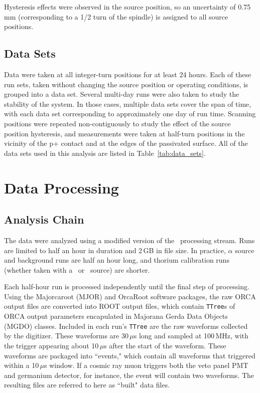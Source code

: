 \documentclass[groupedaddress,rmp,amsmath,amssymb,bibnotes,altaffilletter,twocolumn]{revtex4-1}
\begin{document}
Hysteresis effects were observed in the source position, so an uncertainty of 0.75\,mm (corresponding to a 1/2 turn of the spindle) is assigned to all source positions. 

\subsection{Data Sets}
Data were taken at all integer-turn positions for at least 24 hours. Each of these run sets, taken without changing the source position or operating conditions, is grouped into a data set. Several multi-day runs were also taken to study the stability of the system. In those cases, multiple data sets cover the span of time, with each data set corresponding to approximately one day of run time. Scanning positions were repeated non-contiguously to study the effect of the source position hysteresis, and measurements were taken at half-turn positions in the vicinity of the p+ contact and at the edges of the passivated surface. All of the data sets used in this analysis are listed in Table~\ref{tab:data_sets}.  

%

\section{Data Processing}
\subsection{Analysis Chain}
The data were analyzed using a modified version of the \MJ\ processing stream. Runs are limited to half an hour in duration and 2\,GB in file size. In practice, $\alpha$ source and background runs are half an hour long, and thorium calibration runs (whether taken with a \thtte\ or \thttt\ source) are shorter.

Each half-hour run is processed independently until the final step of processing. Using the Majorcaroot (MJOR)  and OrcaRoot software packages, the raw ORCA output files are converted into ROOT output files, which contain {\tt TTree}s of ORCA output parameters encapulated in Majorana Gerda Data Objects (MGDO) classes. Included in each run's {\tt TTree} are the raw waveforms collected by the digitizer. These waveforms are 30\,$\mu$s long and sampled at 100\,MHz, with the trigger appearing about 10\,$\mu$s after the start of the waveform. These waveforms are packaged into ``events," which contain all waveforms that triggered within a 10\,$\mu$s window. If a cosmic ray muon triggers both the veto panel PMT and germanium detector, for instance, the event will contain two waveforms. The resulting files are referred to here as ``built" data files.
\end{document}
